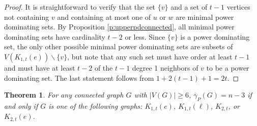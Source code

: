 \documentclass{article}
\numberwithin{figure}{section}   %
\newtheorem{thm}{Theorem}[section]
\theoremstyle{definition}
\theoremstyle{definition}
\theoremstyle{definition}
\newcommand{\ol}{\overline}
\newcommand{\pd}{\gamma_P}
\newcommand{\pdbar}{\ol\pd}
\newcommand{\lh}[1]{{\textcolor{red}{[}\textcolor{red}{{LH: \em #1}]}}}
\begin{document}
\begin{proof}
It is straightforward to verify that the set $\{v\}$ and a set of $t-1$ vertices not containing $v$ and  containing at most one of $u$ or $w$ are minimal power dominating sets.  By Proposition \ref{p:upperpdconnected}, all minimal power dominating sets have cardinality  $t-2$ or less.   Since $\{v\}$ is a power dominating set, the only other possible minimal power dominating sets are subsets of $V(K_{1,t}(e)) \backslash \{v\}$, but note that any such set must have order at least $t-1$ and must have at least $t-2$ of the $t-1$ degree 1 neighbors of $v$ to be a power dominating set.  The last statement follows from $1+2(t-1)+1=2t$. 
\end{proof}

\begin{thm}\label{t:pdbarnless3}
For any connected graph $G$ with  {$|V(G)|\ge 6$}, $\pdbar(G)=n-3$ if and only if $G$ is one of the following graphs: 
 $K_{1,t}(e)$,  $K_{1,t}(\ell)$, $K_{2,t}$, or  $K_{2,t}(e)$.
\end{thm}
\end{document}

